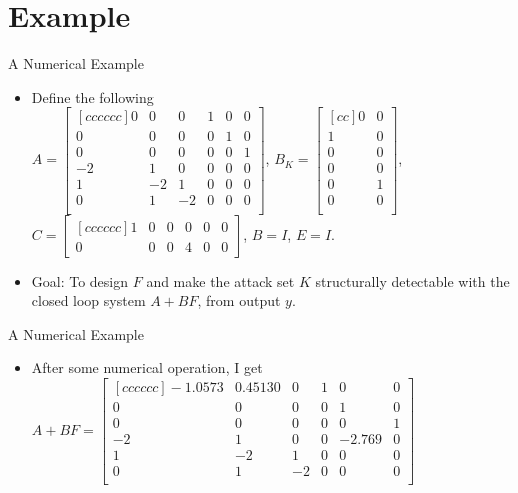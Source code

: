 \documentclass{beamer}
\begin{document}
\section{Example}
\begin{frame}{A Numerical Example}
\begin{itemize}
\item{Define the following\\
$A=\begin{bmatrix}[c c c c c c]
0  & 0  & 0  & 1  & 0  & 0 \\
0  & 0  & 0  & 0  & 1  & 0 \\
0  & 0  & 0  & 0  & 0  & 1 \\
-2 & 1  & 0  & 0  & 0  & 0 \\
1  & -2 & 1  & 0  & 0  & 0 \\
0  & 1  & -2 & 0  & 0  & 0 \\
\end{bmatrix}$,
$B_K=\begin{bmatrix}[c c]
0  & 0  \\
1  & 0  \\
0  & 0  \\
0  & 0  \\
0  & 1  \\
0  & 0  \\
\end{bmatrix}$,
$C=\begin{bmatrix}[c c c c c c]
1  & 0  & 0  & 0  & 0  & 0 \\
0  & 0  & 0  & 4  & 0  & 0 
\end{bmatrix}$, $B=I$, $E=I$.}
\item {Goal: To design $F$ and make the attack set $K$ structurally detectable with the closed loop system $A+BF$, {\color{red}from output $y$}}.
\end{itemize}
\end{frame}
\begin{frame}{A Numerical Example}
\begin{itemize}
\item After some numerical operation, I get
$A+BF=\begin{bmatrix}[c c c c c c]
-1.0573  & 0.45130  & 0  & 1  & 0  & 0 \\
0  & 0  & 0  & 0  & 1  & 0 \\
0  & 0  & 0  & 0  & 0  & 1 \\
-2 & 1  & 0  & 0  & -2.769  & 0 \\
1  & -2 & 1  & 0  & 0  & 0 \\
0  & 1  & -2 & 0  & 0  & 0 \\
\end{bmatrix}$
\end{itemize}
\end{frame}
\end{document}
